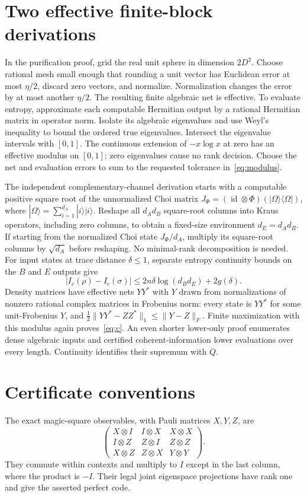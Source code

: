 \appendix
\section{Two effective finite-block derivations}\label{app:effective}
In the purification proof, grid the real unit sphere in dimension
$2D^2$. Choose rational mesh small enough that rounding a unit vector
has Euclidean error at most $\eta/2$, discard zero vectors, and normalize.
Normalization changes the error by at most another $\eta/2$.
The resulting finite algebraic net is effective. To evaluate entropy,
approximate each computable Hermitian output by a rational Hermitian
matrix in operator norm. Isolate its algebraic eigenvalues and use Weyl's
inequality to bound the ordered true eigenvalues. Intersect the
eigenvalue intervals with $[0,1]$. The continuous extension of $-x\log x$ at zero has an effective modulus on $[0,1]$;
zero eigenvalues cause no rank decision. Choose the net and evaluation
errors to sum to the requested tolerance in~\eqref{eq:modulus}.

The independent complementary-channel derivation starts with a
computable positive square root of the unnormalized Choi matrix
$J_\Phi=(\operatorname{id}\otimes\Phi)(|\Omega\rangle\langle\Omega|)$,
where $|\Omega\rangle=\sum_{i=1}^{d_A}|i\rangle|i\rangle$.
Reshape all $d_Ad_B$ square-root columns into Kraus operators, including
zero columns, to obtain a fixed-size environment $d_E=d_Ad_B$.
If starting from the normalized Choi state $J_\Phi/d_A$, multiply its
square-root columns by $\sqrt{d_A}$ before reshaping. No minimal-rank decomposition is
needed. For input states at trace distance $\delta\leq1$, separate
entropy continuity bounds on the $B$ and $E$ outputs give
\[
 |I_c(\rho)-I_c(\sigma)|
 \leq2n\delta\log(d_Bd_E)+2g(\delta).
\]
Density matrices have effective nets $YY^*$ with $Y$ drawn from
normalizations of nonzero rational complex matrices in Frobenius norm:
every state is $YY^*$ for
some unit-Frobenius $Y$, and
$\tfrac12\|YY^*-ZZ^*\|_1\leq\|Y-Z\|_F$.
Finite maximization with this modulus again proves~\eqref{eq:c}.
An even shorter lower-only proof enumerates dense algebraic inputs and
certified coherent-information lower evaluations over every length.
Continuity identifies their supremum with $Q$.

\section{Certificate conventions}\label{app:certs}
The exact magic-square observables, with Pauli matrices $X,Y,Z$, are
\[
 \begin{pmatrix}
 X\otimes I&I\otimes X&X\otimes X\\
 I\otimes Z&Z\otimes I&Z\otimes Z\\
 X\otimes Z&Z\otimes X&Y\otimes Y
 \end{pmatrix}.
\]
They commute within contexts and multiply to $I$ except in the last
column, where the product is $-I$. Their legal joint eigenspace
projections have rank one and give the asserted perfect code.

